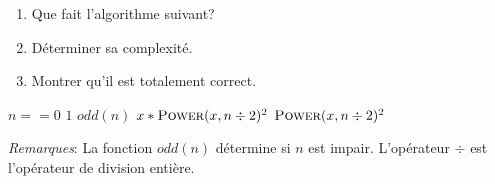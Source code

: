 \documentclass[a4paper,10pt]{article}
\begin{document}
\begin{enumerate}
\item Que fait l'algorithme suivant?
\item Déterminer sa complexité.
\item Montrer qu'il est totalement correct.
\end{enumerate}

\vspace{10pt}
\begin{codebox}
    \li \If $n == 0$
    \li \Then   \Return $1$
    \li \ElseIf $odd(n)$
    \li \Then   \Return $x * \textsc{Power}(x, n \div 2)^2$
    \li \Else
    \li \Return $\textsc{Power}(x, n \div 2)^2$
        \End
\end{codebox}
\vspace{10pt}

\textit{Remarques}: La fonction $odd(n)$ détermine si $n$ est impair. L'opérateur $\div$ est l'opérateur de division entière.


\end{document}
